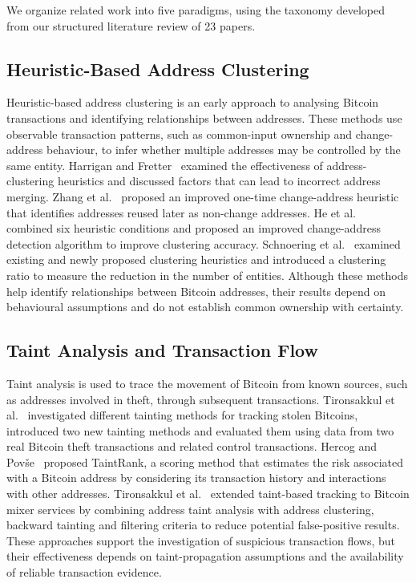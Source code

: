 \documentclass[conference]{IEEEtran}
\begin{document}
We organize related work into five paradigms, using the taxonomy developed
from our structured literature review of 23 papers.

\subsection{Heuristic-Based Address Clustering}

Heuristic-based address clustering is an early approach to analysing Bitcoin
transactions and identifying relationships between addresses.
These methods use observable transaction patterns, such as common-input
ownership and change-address behaviour, to infer whether multiple addresses
may be controlled by the same entity.
Harrigan and Fretter~\cite{harrigan2016unreasonable} examined the
effectiveness of address-clustering heuristics and discussed factors that
can lead to incorrect address merging.
Zhang et al.~\cite{zhang2020heuristic} proposed an improved one-time
change-address heuristic that identifies addresses reused later as
non-change addresses.
He et al.~\cite{he2022bitcoin} combined six heuristic conditions and
proposed an improved change-address detection algorithm to improve
clustering accuracy.
Schnoering et al.~\cite{schnoering2024assessing} examined existing and
newly proposed clustering heuristics and introduced a clustering ratio to
measure the reduction in the number of entities.
Although these methods help identify relationships between Bitcoin addresses,
their results depend on behavioural assumptions and do not establish common
ownership with certainty.

\subsection{Taint Analysis and Transaction Flow}

Taint analysis is used to trace the movement of Bitcoin from known sources,
such as addresses involved in theft, through subsequent transactions.
Tironsakkul et al.~\cite{tironsakkul2019probing} investigated different
tainting methods for tracking stolen Bitcoins, introduced two new tainting
methods and evaluated them using data from two real Bitcoin theft
transactions and related control transactions.
Hercog and Pov{\v{s}}e~\cite{hercog2019taint} proposed TaintRank, a
scoring method that estimates the risk associated with a Bitcoin address
by considering its transaction history and interactions with other
addresses.
Tironsakkul et al.~\cite{tironsakkul2020tracking} extended taint-based
tracking to Bitcoin mixer services by combining address taint analysis with
address clustering, backward tainting and filtering criteria to reduce
potential false-positive results.
These approaches support the investigation of suspicious transaction flows,
but their effectiveness depends on taint-propagation assumptions and the
availability of reliable transaction evidence.
\end{document}
